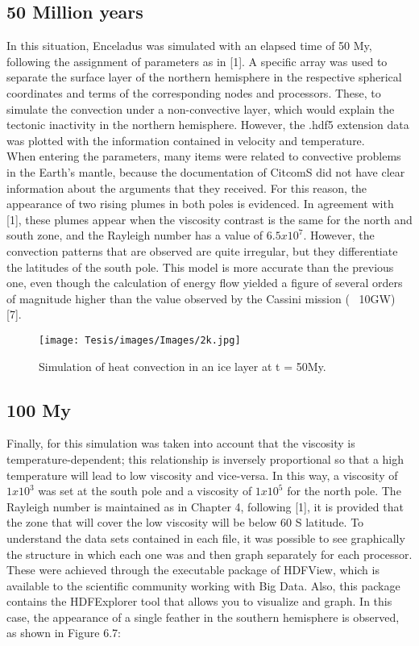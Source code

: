 \documentclass[../main.tex]{subfiles}
\begin{document}
\subsection{50 Million years}
In this situation, Enceladus was simulated with an elapsed time of 50 My, following the assignment of parameters as in [1]. A specific array was used to separate the surface layer of the northern hemisphere in the respective spherical coordinates and terms of the corresponding nodes and processors. These, to simulate the convection under a non-convective layer, which would explain the tectonic inactivity in the northern hemisphere. However, the .hdf5 extension data was plotted with the information contained in velocity and temperature. \\
When entering the parameters, many items were related to convective problems in the Earth's mantle, because the documentation of CitcomS did not have clear information about the arguments that they received. For this reason, the appearance of two rising plumes in both poles is evidenced. In agreement with [1], these plumes appear when the viscosity contrast is the same for the north and south zone, and the Rayleigh number has a value of $ 6.5 x10^{7}$. However, the convection patterns that are observed are quite irregular, but they differentiate the latitudes of the south pole. This model is more accurate than the previous one, even though the calculation of energy flow yielded a figure of several orders of magnitude higher than the value observed by the Cassini mission (~ 10GW) [7].

\begin{figure}[h]
    \centering
    \texttt{[image: Tesis/images/Images/2k.jpg]}
    \label{fig:my_label}
    \centering
    \caption{Simulation of heat convection in an ice layer at t = 50My.}
\end{figure}

\subsection{100 My}

Finally, for this simulation was taken into account that the viscosity is temperature-dependent; this relationship is inversely proportional so that a high temperature will lead to low viscosity and vice-versa. In this way, a viscosity of $ 1x10^{3}$ was set at the south pole and a viscosity of $ 1x10^{5}$ for the north pole. The Rayleigh number is maintained as in Chapter 4, following [1], it is provided that the zone that will cover the low viscosity will be below 60 S latitude. 
To understand the data sets contained in each file, it was possible to see graphically the structure in which each one was and then graph separately for each processor. These were achieved through the executable package of HDFView, which is available to the scientific community working with Big Data. Also, this package contains the HDFExplorer tool that allows you to visualize and graph. In this case, the appearance of a single feather in the southern hemisphere is observed, as shown in Figure 6.7:
\end{document}
